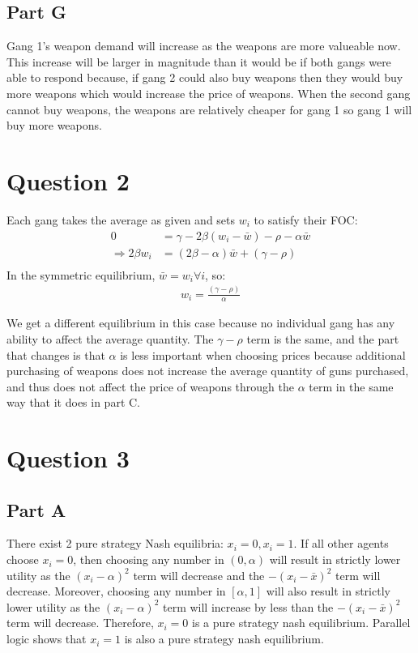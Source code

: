 \documentclass[11pt]{article} %
\begin{document}
\subsection{Part G}
Gang 1's weapon demand will increase as the weapons are more valueable now. This increase will be larger in magnitude than it would be if both gangs were able to respond because, if gang 2 could also buy weapons then they would buy more weapons which would increase the price of weapons. When the second gang cannot buy weapons, the weapons are relatively cheaper for gang 1 so gang 1 will buy more weapons.
\section{Question 2}
Each gang takes the average as given and sets $w_i$ to satisfy their FOC:
\begin{align*}
0&=\gamma - 2\beta (w_i - \bar{w}) - \rho - \alpha \bar{w}\\
\Rightarrow 2\beta w_i &= ( 2\beta - \alpha)\bar{w} + (\gamma - \rho)\\
\end{align*}
In the symmetric equilibrium, $\bar{w} = w_i \forall i$, so:
\begin{align*}
 w_i = \frac{(\gamma - \rho)}{\alpha}
\end{align*}

We get a different equilibrium in this case because no individual gang has any ability to affect the average quantity. The $\gamma - \rho$ term is the same, and the part that changes is that $\alpha$ is less important when choosing prices because additional purchasing of weapons does not increase the average quantity of guns purchased, and thus does not affect the price of weapons through the $\alpha$ term in the same way that it does in part C.

\section{Question 3} 
\subsection{Part A}
%
There exist 2 pure strategy Nash equilibria: $x_i=0,x_i=1.$ If all other agents choose $x_i=0$, then choosing any number in $(0,\alpha)$ will result in strictly lower utility as the $(x_i - \alpha)^2$ term will decrease and the $-(x_i - \bar{x})^2$ term will decrease. Moreover, choosing any number in $[\alpha,1]$ will also result in strictly lower utility as the $(x_i - \alpha)^2$ term will increase by less than the $-(x_i - \bar{x})^2$ term will decrease. Therefore, $x_i = 0$ is a pure strategy nash equilibrium. Parallel logic shows that $x_i=1$ is also a pure strategy nash equilibrium.
\end{document}
